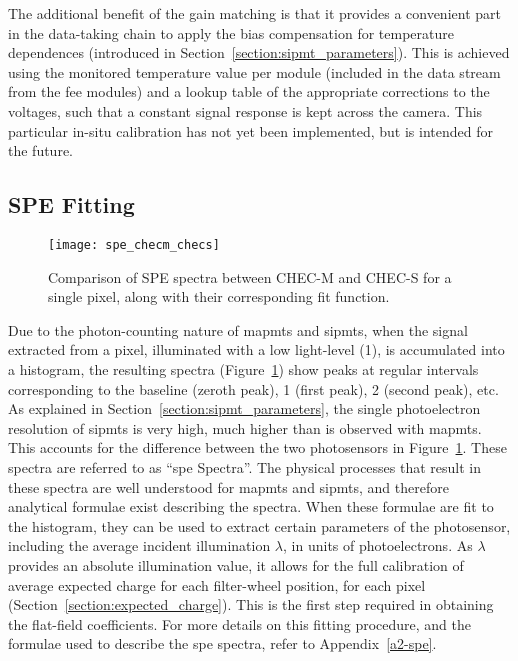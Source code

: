 The additional benefit of the gain matching is that it provides a convenient part in the data-taking chain to apply the bias compensation for temperature dependences (introduced in Section~\ref{section:sipmt_parameters}). This is achieved using the monitored temperature value per module (included in the data stream from the \gls{fee} modules) and a lookup table of the appropriate corrections to the voltages, such that a constant signal response is kept across the camera. This particular in-situ calibration has not yet been implemented, but is intended for the future.

\subsection{SPE Fitting}

\begin{figure}
	\centering
    \texttt{[image: spe\_checm\_checs]} 
	\caption[Comparison of SPE spectra between CHEC-M and CHEC-S.]{Comparison of SPE spectra between CHEC-M and CHEC-S for a single pixel, along with their corresponding fit function.} 
	\label{fig:spe_checm_checs}
\end{figure}

Due to the photon-counting nature of \glspl{mapmt} and \glspl{sipmt}, when the signal extracted from a pixel, illuminated with a low light-level (\utilde\SI{1}{\pe}), is accumulated into a histogram, the resulting spectra (Figure~\ref{fig:spe_checm_checs}) show peaks at regular intervals corresponding to the baseline (zeroth peak), \SI{1}{\pe} (first peak), \SI{2}{\pe} (second peak), etc. As explained in Section~\ref{section:sipmt_parameters}, the single photoelectron resolution of \glspl{sipmt} is very high, much higher than is observed with \glspl{mapmt}. This accounts for the difference between the two photosensors in Figure~\ref{fig:spe_checm_checs}. These spectra are referred to as ``\gls{spe} Spectra''. The physical processes that result in these spectra are well understood for \glspl{mapmt} and \glspl{sipmt}, and therefore analytical formulae  exist describing the spectra. When these formulae are fit to the histogram, they can be used to extract certain parameters of the photosensor, including the average incident illumination $\lambda$, in units of photoelectrons. As $\lambda$ provides an absolute illumination value, it allows for the full calibration of average expected charge for each filter-wheel position, for each pixel (Section~\ref{section:expected_charge}). This is the first step required in obtaining the flat-field coefficients. For more details on this fitting procedure, and the formulae used to describe the \gls{spe} spectra, refer to Appendix~\ref{a2-spe}.

